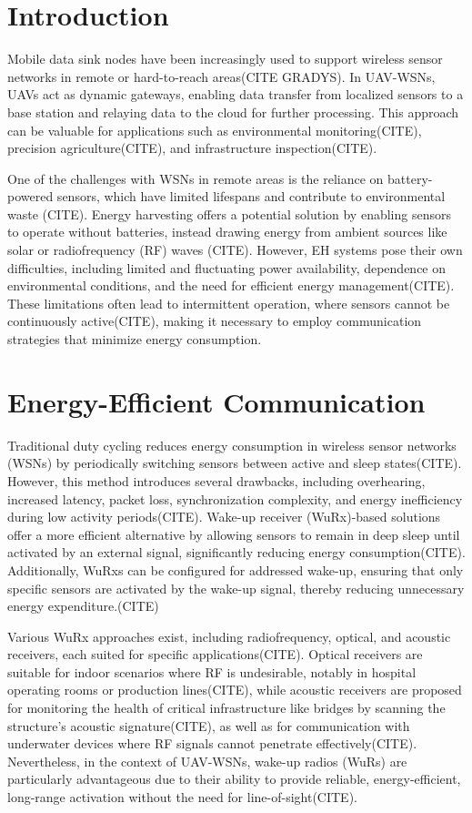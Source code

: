 \documentclass[conference]{IEEEtran}
\begin{document}
\section{Introduction}

Mobile data sink nodes have been increasingly used to support wireless sensor networks in remote or hard-to-reach areas(CITE GRADYS). In UAV-WSNs, UAVs act as dynamic gateways, enabling data transfer from localized sensors to a base station and relaying data to the cloud for further processing. This approach can be valuable for applications such as environmental monitoring(CITE), precision agriculture(CITE), and infrastructure inspection(CITE).

One of the challenges with WSNs in remote areas is the reliance on battery-powered sensors, which have limited lifespans and contribute to environmental waste (CITE). Energy harvesting offers a potential solution by enabling sensors to operate without batteries, instead drawing energy from ambient sources like solar or radiofrequency (RF) waves (CITE). However, EH systems pose their own difficulties, including limited and fluctuating power availability, dependence on environmental conditions, and the need for efficient energy management(CITE). These limitations often lead to intermittent operation, where sensors cannot be continuously active(CITE), making it necessary to employ communication strategies that minimize energy consumption.

\section{Energy-Efficient Communication}

Traditional duty cycling reduces energy consumption in wireless sensor networks (WSNs) by periodically switching sensors between active and sleep states(CITE). However, this method introduces several drawbacks, including overhearing, increased latency, packet loss, synchronization complexity, and energy inefficiency during low activity periods(CITE). Wake-up receiver (WuRx)-based solutions offer a more efficient alternative by allowing sensors to remain in deep sleep until activated by an external signal, significantly reducing energy consumption(CITE). Additionally, WuRxs can be configured for addressed wake-up, ensuring that only specific sensors are activated by the wake-up signal, thereby reducing unnecessary energy expenditure.(CITE)

Various WuRx approaches exist, including radiofrequency, optical, and acoustic receivers, each suited for specific applications(CITE). Optical receivers are suitable for indoor scenarios where RF is undesirable, notably in hospital operating rooms or production lines(CITE), while acoustic receivers are proposed for monitoring the health of critical infrastructure like bridges by scanning the structure's acoustic signature(CITE), as well as for communication with underwater devices where RF signals cannot penetrate effectively(CITE). Nevertheless, in the context of UAV-WSNs, wake-up radios (WuRs) are particularly advantageous due to their ability to provide reliable, energy-efficient, long-range activation without the need for line-of-sight(CITE).
\end{document}
